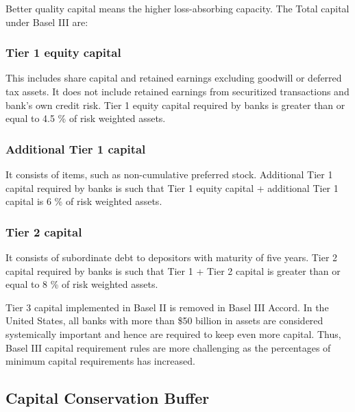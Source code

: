 \documentclass[11pt]{article}
\numberwithin{equation}{section}
\begin{document}
 Better quality capital means the higher loss-absorbing capacity. The Total capital under Basel III are:
 \subsubsection{Tier 1 equity capital}
 \medskip
 
  This includes share capital and retained earnings excluding goodwill or deferred tax assets. It does not include retained earnings from securitized transactions and bank's own credit risk. Tier 1 equity capital required by banks is greater than or equal to 4.5 \% of risk weighted assets.

\subsubsection{Additional Tier 1 capital}
\medskip

It consists of items, such as non-cumulative preferred stock. Additional Tier 1 capital required by banks is such that Tier 1 equity capital + additional Tier 1 capital is 6 \% of risk weighted assets.

\subsubsection{Tier 2 capital}
\medskip

It consists of subordinate debt to depositors with maturity of five years.  Tier 2 capital required by banks is such that Tier 1 + Tier 2 capital is greater than or equal to 8 \% of risk weighted assets.

\hspace{1cm} Tier 3 capital implemented in Basel II is removed in Basel III Accord. In the United States, all banks with more than \$50 billion in assets are considered systemically important and hence are required to keep even more capital. Thus, Basel III capital requirement rules are more challenging as the percentages of minimum capital requirements has increased.

\subsection{Capital Conservation Buffer}
\medskip
\end{document}
